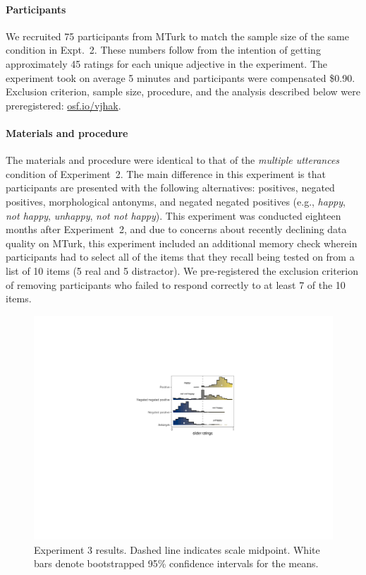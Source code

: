 \documentclass[floatsintext,doc]{apa6}
\let\oldparagraph\paragraph
\renewcommand{\paragraph}[1]{\oldparagraph{#1}\mbox{}}
\begin{document}
\paragraph{Participants}\label{participants-3}

We recruited 75 participants from MTurk to match the sample size of the same condition in Expt.~2.
These numbers follow from the intention of getting approximately 45 ratings for each unique adjective in the experiment.
The experiment took on average 5 minutes and participants were compensated \$0.90.
Exclusion criterion, sample size, procedure, and the analysis described below were preregistered: \url{osf.io/vjhak}.

\paragraph{Materials and procedure}\label{materials-3}

The materials and procedure were identical to that of the \emph{multiple utterances} condition of Experiment~2.
The main difference in this experiment is that participants are presented with the following alternatives: positives, negated positives, morphological antonyms, and negated negated positives (e.g., \emph{happy}, \emph{not happy}, \emph{unhappy}, \emph{not not happy}).
This experiment was conducted eighteen months after Experiment~2, and due to concerns about recently declining data quality on MTurk, this experiment included an additional memory check wherein participants had to select all of the items that they recall being tested on from a list of 10 items (5 real and 5 distractor). 
We pre-registered the exclusion criterion of removing participants who failed to respond correctly to at least 7 of the 10 items. 

\begin{figure}[h]
\centering \includegraphics[width=0.75\linewidth]{figs/expt3_directlabel_hist} 
\caption{Experiment 3 results. Dashed line indicates scale midpoint. White bars denote bootstrapped 95\% confidence intervals for the means.}\label{fig:expt3-results}
\end{figure}
\end{document}
